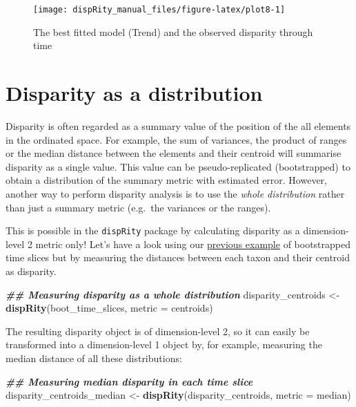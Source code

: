 \documentclass[
]{book}
\newenvironment{Shaded}{\begin{snugshade}}{\end{snugshade}}
\newcommand{\AttributeTok}[1]{\textcolor[rgb]{0.13,0.29,0.53}{#1}}
\newcommand{\DocumentationTok}[1]{\textcolor[rgb]{0.56,0.35,0.01}{\textbf{\textit{#1}}}}
\newcommand{\FunctionTok}[1]{\textcolor[rgb]{0.13,0.29,0.53}{\textbf{#1}}}
\newcommand{\NormalTok}[1]{#1}
\newcommand{\OtherTok}[1]{\textcolor[rgb]{0.56,0.35,0.01}{#1}}
\begin{document}
\begin{figure}

{\centering \texttt{[image: dispRity\_manual\_files/figure-latex/plot8-1]} 

}

\caption{The best fitted model (Trend) and the observed disparity through time}\label{fig:plot8}
\end{figure}

\hypertarget{disparity-distribution}{%
\section{Disparity as a distribution}\label{disparity-distribution}}

Disparity is often regarded as a summary value of the position of the all elements in the ordinated space.
For example, the sum of variances, the product of ranges or the median distance between the elements and their centroid will summarise disparity as a single value.
This value can be pseudo-replicated (bootstrapped) to obtain a distribution of the summary metric with estimated error.
However, another way to perform disparity analysis is to use the \emph{whole distribution} rather than just a summary metric (e.g.~the variances or the ranges).

This is possible in the \texttt{dispRity} package by calculating disparity as a dimension-level 2 metric only!
Let's have a look using our \protect\hyperlink{summarising-dispRity-data-plots}{previous example} of bootstrapped time slices but by measuring the distances between each taxon and their centroid as disparity.

\begin{Shaded}
\begin{Highlighting}[]
\DocumentationTok{\#\# Measuring disparity as a whole distribution}
\NormalTok{disparity\_centroids }\OtherTok{\textless{}{-}} \FunctionTok{dispRity}\NormalTok{(boot\_time\_slices, }
                                \AttributeTok{metric =}\NormalTok{ centroids)}
\end{Highlighting}
\end{Shaded}

The resulting disparity object is of dimension-level 2, so it can easily be transformed into a dimension-level 1 object by, for example, measuring the median distance of all these distributions:

\begin{Shaded}
\begin{Highlighting}[]
\DocumentationTok{\#\# Measuring median disparity in each time slice}
\NormalTok{disparity\_centroids\_median }\OtherTok{\textless{}{-}} \FunctionTok{dispRity}\NormalTok{(disparity\_centroids,}
                                       \AttributeTok{metric =}\NormalTok{ median)}
\end{Highlighting}
\end{Shaded}
\end{document}
